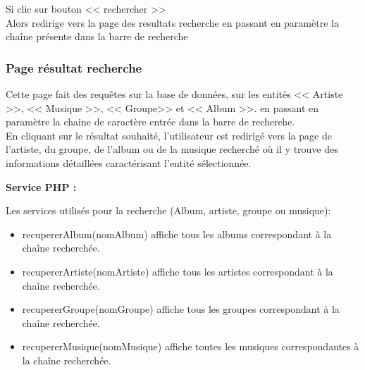             \begin{paragraphe}
                Si clic sur bouton << rechercher >> \\
                Alors redirige vers la page des resultats recherche en passant en paramètre la chaîne présente dans la barre de recherche
            \end{paragraphe}


        \clearpage

		\subsubsection{Page résultat recherche}

			\begin{paragraphe}
				Cette page fait des requêtes sur la base de données, sur les entités << Artiste >>, << Musique >>, << Groupe>> et << Album >>.
				 en passant en paramètre la chaine de caractère entrée dans la barre de recherche.\\
                En cliquant sur le résultat souhaité, l'utilisateur est redirigé vers la page de l'artiste, du groupe, de l'album ou de la musique
                 recherché où il y trouve des informations détaillées caractérisant l'entité sélectionnée.
            \end{paragraphe}

            \begin{paragraphe}
                \textbf{Service PHP :}
            \end{paragraphe}

            \begin{paragraphe}
                Les services utilisés pour la recherche (Album, artiste, groupe ou musique):
                 \begin{itemize}
                     \item recupererAlbum(nomAlbum) affiche tous les albums correspondant à la chaîne recherchée.
                     \item recupererArtiste(nomArtiste) affiche tous les artistes correspondant à la chaîne recherchée.
                     \item recupererGroupe(nomGroupe) affiche tous les groupes correspondant à la chaîne recherchée.
                     \item recupererMusique(nomMusique) affiche toutes les musiques correspondantes à la chaîne recherchée.
                 \end{itemize}
             \end{paragraphe}

